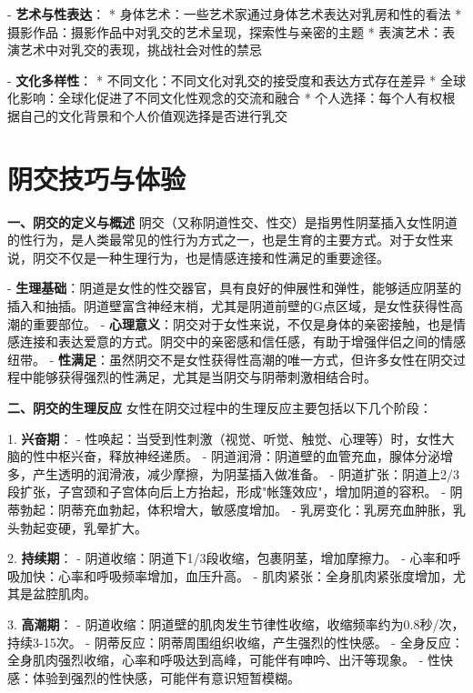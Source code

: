 \begin{enumerate}
  - \textbf{艺术与性表达}：
    * 身体艺术：一些艺术家通过身体艺术表达对乳房和性的看法
    * 摄影作品：摄影作品中对乳交的艺术呈现，探索性与亲密的主题
    * 表演艺术：表演艺术中对乳交的表现，挑战社会对性的禁忌

  - \textbf{文化多样性}：
    * 不同文化：不同文化对乳交的接受度和表达方式存在差异
    * 全球化影响：全球化促进了不同文化性观念的交流和融合
    * 个人选择：每个人有权根据自己的文化背景和个人价值观选择是否进行乳交

\section{阴交技巧与体验}

  \textbf{一、阴交的定义与概述}
  阴交（又称阴道性交、性交）是指男性阴茎插入女性阴道的性行为，是人类最常见的性行为方式之一，也是生育的主要方式。对于女性来说，阴交不仅是一种生理行为，也是情感连接和性满足的重要途径。

  - \textbf{生理基础}：阴道是女性的性交器官，具有良好的伸展性和弹性，能够适应阴茎的插入和抽插。阴道壁富含神经末梢，尤其是阴道前壁的G点区域，是女性获得性高潮的重要部位。
  - \textbf{心理意义}：阴交对于女性来说，不仅是身体的亲密接触，也是情感连接和表达爱意的方式。阴交中的亲密感和信任感，有助于增强伴侣之间的情感纽带。
  - \textbf{性满足}：虽然阴交不是女性获得性高潮的唯一方式，但许多女性在阴交过程中能够获得强烈的性满足，尤其是当阴交与阴蒂刺激相结合时。

  \textbf{二、阴交的生理反应}
  女性在阴交过程中的生理反应主要包括以下几个阶段：

  1. \textbf{兴奋期}：
     - 性唤起：当受到性刺激（视觉、听觉、触觉、心理等）时，女性大脑的性中枢兴奋，释放神经递质。
     - 阴道润滑：阴道壁的血管充血，腺体分泌增多，产生透明的润滑液，减少摩擦，为阴茎插入做准备。
     - 阴道扩张：阴道上2/3段扩张，子宫颈和子宫体向后上方抬起，形成"帐篷效应"，增加阴道的容积。
     - 阴蒂勃起：阴蒂充血勃起，体积增大，敏感度增加。
     - 乳房变化：乳房充血肿胀，乳头勃起变硬，乳晕扩大。

  2. \textbf{持续期}：
     - 阴道收缩：阴道下1/3段收缩，包裹阴茎，增加摩擦力。
     - 心率和呼吸加快：心率和呼吸频率增加，血压升高。
     - 肌肉紧张：全身肌肉紧张度增加，尤其是盆腔肌肉。

  3. \textbf{高潮期}：
     - 阴道收缩：阴道壁的肌肉发生节律性收缩，收缩频率约为0.8秒/次，持续3-15次。
     - 阴蒂反应：阴蒂周围组织收缩，产生强烈的性快感。
     - 全身反应：全身肌肉强烈收缩，心率和呼吸达到高峰，可能伴有呻吟、出汗等现象。
     - 性快感：体验到强烈的性快感，可能伴有意识短暂模糊。


\end{enumerate}
